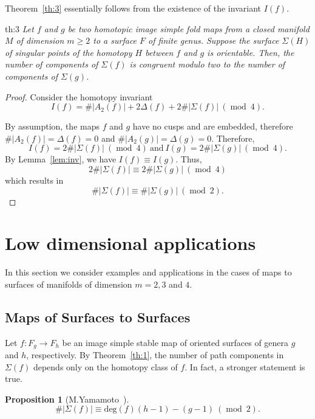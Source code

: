 \documentclass[12pt]{amsart}
\def\mod{{\mathop\mathrm{mod}\ }}
\newtheorem{proposition}[theorem]{Proposition}
\theoremstyle{definition}
\begin{document}
{Theorem~\ref{th:3} essentially follows from the existence of the invariant $I(f)$. 

\begin{reptheorem}{th:3}
\textit {Let $f$ and $g$ be two homotopic image simple fold maps  %
	from a closed manifold $M$ of dimension  $m\geq2$ to a surface $F$ of finite genus. 
	Suppose the surface $\Sigma(H)$ of singular points of the homotopy $H$ between $f$ and $g$ is orientable. Then, the number of components of $\Sigma(f)$ is congruent modulo two to the number of components of $\Sigma(g)$. }
\end{reptheorem}

 \begin{proof} 
 Consider the homotopy invariant 
 \[
 I(f) = \#|A_2(f)| + 2\Delta(f) +  2\#|\Sigma(f)| ~(\mod 4).
 \]
 
   By assumption, the maps $f$ and $g$ have no cusps and are embedded, therefore $\#|A_2(f)| = \Delta(f) =0$ and $\#|A_2(g)| = \Delta(g) =0$.   Therefore,
 \[
I(f) =2\#|\Sigma(f)| ~(\mod 4) ~\textrm{and} ~ I(g) =2\#|\Sigma(g)| ~(\mod 4).
 \]
By Lemma~\ref{lem:inv},  we have $I(f) \equiv I(g)$.  Thus,
 \[
 2\#|\Sigma(f)| \equiv 2\#|\Sigma(g)| \ (\mod 4)
 \]
which results in 
 \[
 \#|\Sigma(f)| \equiv \#|\Sigma(g)| \ (\mod 2).
 \]
\end{proof}

\section{Low dimensional applications}\label{s:e12}

 In this section we consider examples and applications in the cases of maps to surfaces of manifolds of dimension $m=2,3$ and $4$.

\subsection{Maps of Surfaces to Surfaces}
Let $f:F_g \rightarrow F_h$ be an image simple stable map of oriented surfaces of genera $g$ and $h$, respectively.  By Theorem~\ref{th:1}, the number of path components in $\Sigma(f)$ depends only on the homotopy class of $f$. In fact, a stronger statement is true. 

\begin{proposition}[M.Yamamoto~\cite{Ya}]
\[
\#|\Sigma(f)| \equiv \mathrm{deg}(f)(h-1) - (g-1) ~(\mod 2).
\]
\end{proposition}

}
\end{document}
